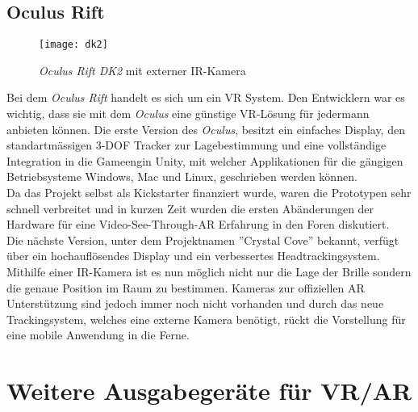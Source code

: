 \subsection*{Oculus Rift}
\begin{wrapfigure}{l}{0.5\textwidth}
	\vspace{-20pt}
	\begin{center}
		\texttt{[image: dk2]}
	\end{center}
	\vspace{-15pt}
	\captionsetup{width=0.42\textwidth}
	\caption{\textit{Oculus Rift DK2} mit externer IR-Kamera}\label{oculus}
	\vspace{-12pt}
\end{wrapfigure}
Bei dem \textit{Oculus Rift} handelt es sich um ein VR System. Den Entwicklern war es wichtig, dass sie mit dem \textit{Oculus} eine günstige VR-Lösung für jedermann anbieten können. Die erste Version des \textit{Oculus}, besitzt ein einfaches Display, den standartmässigen 3-DOF Tracker zur Lagebestimmung und eine vollständige Integration in die Gameengin Unity, mit welcher Applikationen für die gängigen Betriebsysteme Windows, Mac und Linux, geschrieben werden können.\cite{website:oculus1}\\[6pt]
Da das Projekt selbst als Kickstarter finanziert wurde, waren die Prototypen sehr schnell verbreitet und in kurzen Zeit wurden die ersten Abänderungen der Hardware für eine Video-See-Through-AR Erfahrung in den Foren diskutiert.\cite{website:arrift}\\[6pt]
Die nächste Version, unter dem Projektnamen ''Crystal Cove'' bekannt, verfügt über ein hochauflösendes Display und ein verbessertes Headtrackingsystem. Mithilfe einer IR-Kamera ist es nun möglich nicht nur die Lage der Brille sondern die genaue Position im Raum zu bestimmen. Kameras zur offiziellen AR Unterstützung sind jedoch immer noch nicht vorhanden und durch das neue Trackingsystem, welches eine externe Kamera benötigt, rückt die Vorstellung für eine mobile Anwendung in die Ferne.\cite{website:oculus2}
\newpage
\section{Weitere Ausgabegeräte für VR/AR}\label{s.otherdevices}
